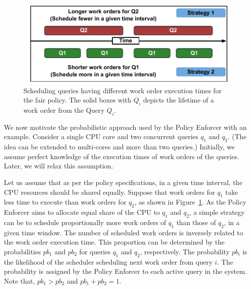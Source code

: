 \begin{figure}[]
	\centering
	\includegraphics[width=\columnwidth]{policy/figures/Probability-explanation.pdf}
	\vspace{-2em}
	\caption{Scheduling queries having different work order execution times for the fair policy. The solid boxes with $Q_{i}$ depicts the lifetime of a work order from the Query $Q_{i}$.}
	\label{fig:probability-explanation}
\end{figure}

We now motivate the probabilistic approach used by the Policy Enforcer with an example.
Consider a single CPU core and two concurrent queries $q_{1}$ and $q_{2}$. 
(The idea can be extended to multi-cores and more than two queries.)
Initially, we assume perfect knowledge of the execution times of work orders of the queries. 
Later, we will relax this assumption. 

Let us assume that as per the policy specifications, in a given time interval, the CPU resources should be shared equally. 
Suppose that work orders for $q_{1}$ take less time to execute than work orders for 
$q_{2}$, as shown in Figure~\ref{fig:probability-explanation}.
As the Policy Enforcer aims to allocate equal share of the CPU to $q_1$ and $q_2$, a simple strategy can be to schedule proportionally more work orders of $q_{1}$  than those of $q_{2}$, in a given time window. 
The number of scheduled work orders is inversely related to the work order execution 
time. 
This proportion can be determined by the probabilities $pb_{1}$ and $pb_{2}$ for queries $q_1$ and $q_2$, respectively.
The probability $pb_i$ is the likelihood of the scheduler scheduling next work order from query $i$. 
The probability is assigned by the Policy Enforcer to each active query in the system.
Note that, $pb_{1} > pb_{2}$ and $pb_{1} + pb_{2} = 1$.


